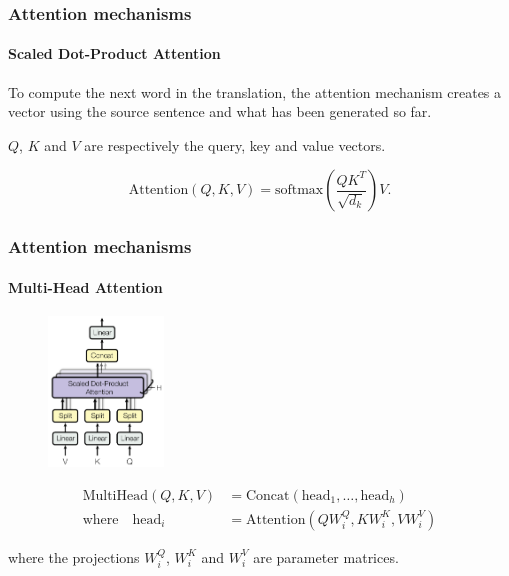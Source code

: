 \documentclass[9pt]{beamer}
\begin{document}


\begin{frame}

  \frametitle{Attention mechanisms}

  \framesubtitle{Scaled Dot-Product Attention}

  \medskip

  To compute the next word in the translation, the attention mechanism
  creates a vector using the source sentence and what has been
  generated so far.

  \begin{figure}
    \scalebox{0.85}{
      
    }
  \end{figure}

  $Q$, $K$ and $V$ are respectively the query, key and value vectors.

  \bigskip

  \[
  \text{Attention}(Q, K, V) = \text{softmax}(\frac{QK^{T}}{\sqrt{d_{k}}}) V.
  \]

\end{frame}

\begin{frame}

  \frametitle{Attention mechanisms}

  \framesubtitle{Multi-Head Attention}

  \begin{figure}
    \includegraphics[height = 4cm]{images/multi_head_attention.png}
  \end{figure}

  \begin{align*}
    \text{MultiHead}(Q, K, V) &= \text{Concat}(\text{head}_{1}, \dots, \text{head}_{h}) \\
    \text{where} \quad \text{head}_{i} &= \text{Attention}(QW^{Q}_{i}, KW^{K}_{i},
  VW^{V}_{i})
  \end{align*}

  \bigskip

  where the projections $W^{Q}_{i}$, $W^{K}_{i}$ and $W^{V}_{i}$ are
  parameter matrices.
\end{frame}
\end{document}
